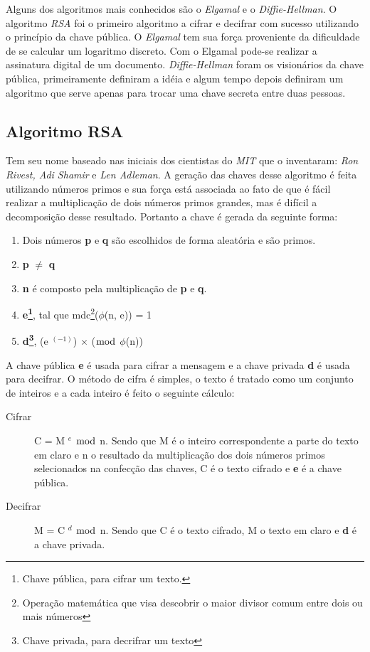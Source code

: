 %
Alguns dos algoritmos mais conhecidos são o \textit{Elgamal} e o \textit{Diffie-Hellman}. O algoritmo \textit{RSA} foi o primeiro algoritmo a cifrar e decifrar com sucesso utilizando o princípio da chave pública. O \textit{Elgamal} tem sua força proveniente da dificuldade de se calcular um logaritmo discreto. Com o Elgamal pode-se realizar a assinatura digital de um documento. \textit{Diffie-Hellman} foram os visionários da chave pública, primeiramente definiram a idéia e algum tempo depois definiram um algoritmo que serve apenas para trocar uma chave secreta entre duas pessoas. 

\subsection{Algoritmo RSA}
\label{algorithm-rsa}

Tem seu nome baseado nas iniciais dos cientistas do \textit{MIT} que o inventaram: \textit{Ron Rivest, Adi Shamir} e \textit{Len Adleman}. A geração das chaves desse algoritmo é feita utilizando números primos e sua força está associada ao fato de que é fácil realizar a multiplicação de dois números primos grandes, mas é difícil a decomposição desse resultado. Portanto a chave é gerada da seguinte forma:

\begin{enumerate}
\item Dois números \textbf{p} e \textbf{q} são escolhidos de forma aleatória e são primos.
\item \textbf{p} $\neq$ \textbf{q}
\item \textbf{n} é composto pela multiplicação de \textbf{p} e \textbf{q}.
\item \textbf{e\footnote{Chave pública, para cifrar um texto.}}, tal que mdc\footnote{Operação matemática que visa descobrir o maior divisor comum entre dois ou mais números}($\phi$(n, e)) = 1
\item \textbf{d\footnote{Chave privada, para decrifrar um texto }}, (e $^ {(-1)}$) $\times$ ($\bmod$ $\phi$(n)) 
\end{enumerate}

%
A chave pública \textbf{e}  é usada para cifrar a mensagem e a chave privada \textbf{d} é usada para decifrar. O método de cifra é simples, o texto é tratado como um conjunto de inteiros e a cada inteiro é feito o seguinte cálculo:

\begin{description}
\item [Cifrar]
C = M $^ e$ $\bmod$ n. Sendo que M é o inteiro correspondente a parte do texto em claro e n o resultado da multiplicação dos dois números primos selecionados na confecção  das chaves, C é o texto cifrado e \textbf{e} é a chave pública. 
\item [Decifrar]
M = C $^ d$ $\bmod$ n. Sendo que C é o texto cifrado, M o texto em claro e \textbf{d} é a chave privada.
\end{description}

